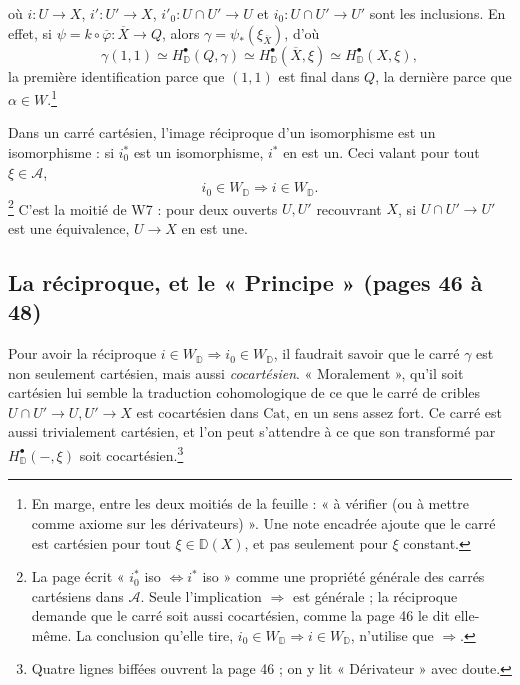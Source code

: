 \documentclass[11pt,a4paper]{article}
\begin{document}
où $i : U \to X$, $i' : U' \to X$, $i'_0 : U \cap U' \to U$ et
$i_0 : U \cap U' \to U'$ sont les inclusions. En effet, si
$\psi = k \circ \overline{\varphi} : \overline{X} \to Q$, alors $\gamma =
\psi_*(\xi_{\overline{X}})$, d'où
\[
\gamma(1,1) \simeq H^\bullet_{\mathbb D}(Q, \gamma) \simeq
H^\bullet_{\mathbb D}(\overline{X}, \xi) \simeq H^\bullet_{\mathbb D}(X, \xi),
\]
la première identification parce que $(1,1)$ est final dans $Q$, la dernière
parce que $\alpha \in W$.\footnote{En marge, entre les deux moitiés de la
feuille : « à vérifier (ou à mettre comme axiome sur les dérivateurs) ». Une
note encadrée ajoute que le carré est cartésien pour tout
$\xi \in \mathbb D(X)$, et pas seulement pour $\xi$ constant.}

Dans un carré cartésien, l'image réciproque d'un isomorphisme est un
isomorphisme : si $i_0^*$ est un isomorphisme, $i^*$ en est un. Ceci valant
pour tout $\xi \in \mathcal{A}$,
\[
i_0 \in W_{\mathbb D} \Longrightarrow i \in W_{\mathbb D} .
\]
\footnote{La page écrit « $i_0^*$ iso $\Longleftrightarrow i^*$ iso » comme
une propriété générale des carrés cartésiens dans $\mathcal{A}$. Seule
l'implication $\Rightarrow$ est générale ; la réciproque demande que le carré
soit aussi cocartésien, comme la page 46 le dit elle-même. La
conclusion qu'elle tire, $i_0 \in W_{\mathbb D} \Rightarrow i \in
W_{\mathbb D}$, n'utilise que $\Rightarrow$.} C'est la moitié de W7 : pour
deux ouverts $U, U'$ recouvrant $X$, si $U \cap U' \to U'$ est une
équivalence, $U \to X$ en est une.

\subsection*{La réciproque, et le « Principe » (pages 46 à 48)}

Pour avoir la réciproque $i \in W_{\mathbb D} \Rightarrow i_0 \in
W_{\mathbb D}$, il faudrait savoir que le carré $\gamma$ est non seulement
cartésien, mais aussi \emph{cocartésien}. « Moralement », qu'il soit cartésien
lui semble la traduction cohomologique de ce que le carré de cribles
$U \cap U' \to U, U' \to X$ est cocartésien dans $\mathrm{Cat}$, en un sens
assez fort. Ce carré est aussi trivialement cartésien, et l'on peut s'attendre
à ce que son transformé par $H^\bullet_{\mathbb D}(-, \xi)$ soit
cocartésien.\footnote{Quatre lignes biffées ouvrent la page 46 ; on y lit
« Dérivateur » avec doute.}
\end{document}
